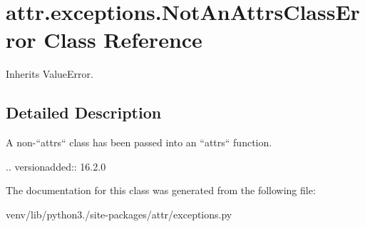 \hypertarget{classattr_1_1exceptions_1_1_not_an_attrs_class_error}{}\section{attr.\+exceptions.\+Not\+An\+Attrs\+Class\+Error Class Reference}
\label{classattr_1_1exceptions_1_1_not_an_attrs_class_error}


Inherits Value\+Error.



\subsection{Detailed Description}
\begin{DoxyVerb}A non-``attrs`` class has been passed into an ``attrs`` function.

.. versionadded:: 16.2.0
\end{DoxyVerb}
 

The documentation for this class was generated from the following file\+:\begin{DoxyCompactItemize}
\item 
venv/lib/python3./site-\/packages/attr/exceptions.\+py\end{DoxyCompactItemize}
